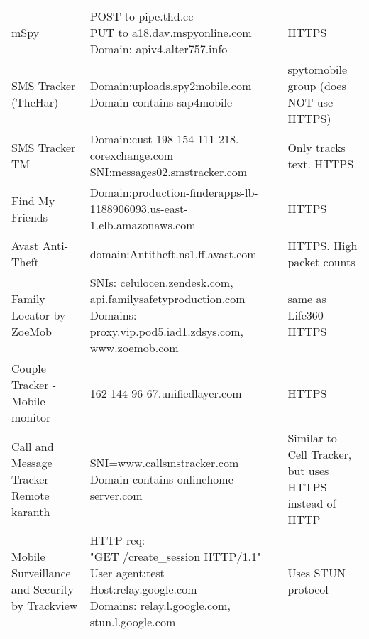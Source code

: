 \documentclass[acmtog]{acmart}
\begin{document}
\begin{table*}
\begin{tabular}{p{5cm}p{5cm}p{5cm}}
	mSpy & \makecell{POST to pipe.thd.cc\\
	PUT to a18.dav.mspyonline.com\\
	Domain: apiv4.alter757.info} & HTTPS \\
	
	SMS Tracker (TheHar) & \makecell{Domain:uploads.spy2mobile.com\\ Domain contains sap4mobile} & spytomobile group (does NOT use HTTPS) \\
	
	SMS Tracker TM & \makecell{Domain:cust-198-154-111-218.\\corexchange.com \\ SNI:messages02.smstracker.com} & Only tracks text. HTTPS \\
	
	Find My Friends & Domain:production-finderapps-lb-1188906093.us-east-1.elb.amazonaws.com & HTTPS\\
	
	Avast Anti-Theft & domain:Antitheft.ns1.ff.avast.com& HTTPS. High packet counts\\
	
	Family Locator by ZoeMob & SNIs: celulocen.zendesk.com, api.familysafetyproduction.com
	Domains: proxy.vip.pod5.iad1.zdsys.com, www.zoemob.com & same as Life360
	HTTPS \\
	
	Couple Tracker -Mobile monitor & 162-144-96-67.unifiedlayer.com & HTTPS \\
	
	Call and Message Tracker -Remote karanth & \makecell{SNI=www.callsmstracker.com
	\\Domain contains onlinehome-server.com} & Similar to Cell Tracker, but uses HTTPS instead of HTTP \\
	
	Mobile Surveillance and Security
	by Trackview & \makecell{HTTP req:\\ "GET /create\_session HTTP/1.1"\\ User agent:test \\Host:relay.google.com\\
	Domains: relay.l.google.com,\\ stun.l.google.com} & Uses STUN protocol \\
	
\end{tabular}
\end{table*}
\end{document}
